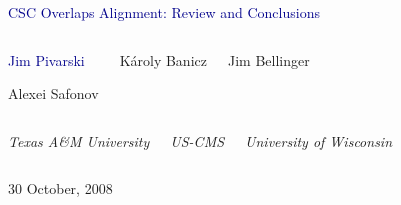 \documentclass[compress]{beamer}
\begin{document}
\begin{frame}
\vfill
\begin{center}
\textcolor{darkblue}{\Large CSC Overlaps Alignment: Review and Conclusions}

\vfill
\begin{columns}
\begin{center}
\large
\textcolor{darkblue}{Jim Pivarski}

\vspace{0.2 cm}
Alexei Safonov
\end{center}

\begin{center}
\large
K\'aroly Banicz
\end{center}

\begin{center}
\large
Jim Bellinger
\end{center}
\end{columns}

\begin{columns}
\begin{center}
\scriptsize
{\it Texas A\&M University}
\end{center}

\begin{center}
\scriptsize
{\it US-CMS}
\end{center}

\begin{center}
\scriptsize
{\it University of Wisconsin}
\end{center}
\end{columns}

\vfill
30 October, 2008

\end{center}
\end{frame}

\end{document}
